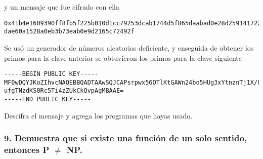 \documentclass[14pt]{article}
\begin{document}
y un mensaje que fue cifrado con ella

\begin{verbatim}
0x41b4e1609390ff8fb5f225b010d1cc79253dcab1744d5f865daabad0e28d259141722382114d9a73106b4d429676
dae60a1528a0eb3b73eab0e9d2165c72492f
\end{verbatim}
Se usó un generador de números aleatorios deficiente, y enseguida de obtener los primos para la clave anterior se obtuvieron los primos para la clave siguiente

\begin{verbatim}
-----BEGIN PUBLIC KEY-----
MF0wDQYJKoZIhvcNAQEBBQADTAAwSQJCAPsrpwx56OTlKtGAWn24bo5HUg3xYtnznTj1X/8Hq7pLYNIVE57Yxoyr3zTOOBJ
ufgTNzdKS0Rc5Ti4zZUkCkQvpAgMBAAE=
-----END PUBLIC KEY-----
\end{verbatim}

Descifra el mensaje y agrega los programas que hayas usado.

\subsubsection*{9. Demuestra que si existe una función de un solo sentido, entonces P $\neq$ NP.}
\end{document}
